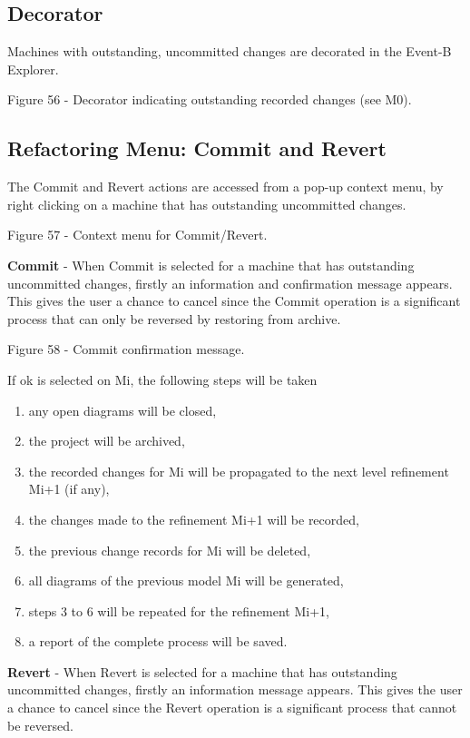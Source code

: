 \subsection{Decorator}

Machines with outstanding, uncommitted changes are decorated in the Event-B Explorer. 

Figure 56 - Decorator indicating outstanding recorded changes (see M0).

\subsection{Refactoring Menu: Commit and Revert}

The Commit and Revert actions are accessed from a pop-up context menu, by right clicking on a machine that has outstanding uncommitted changes.

Figure 57 - Context menu for Commit/Revert.

\textbf{Commit} -
When Commit is selected for a machine that has outstanding uncommitted changes, firstly an information and confirmation message appears. This gives the user a chance to cancel since the Commit operation is a significant process that can only be reversed by restoring from archive.

Figure 58 - Commit confirmation message.

If ok is selected on Mi, the following steps will be taken
\begin{enumerate}
\item any open diagrams will be closed, 
\item the project will be archived,
\item the recorded changes for Mi will be propagated to the next level refinement Mi+1 (if any),
\item the changes made to the refinement Mi+1 will be recorded,
\item the previous change records for Mi will be deleted,
\item all diagrams of the previous model Mi will be generated,
\item steps 3 to 6 will be repeated for the refinement Mi+1,
\item a report of the complete process will be saved.
\end{enumerate}


\textbf{Revert} -
When Revert is selected for a machine that has outstanding uncommitted changes, firstly an information message appears. This gives the user a chance to cancel since the Revert operation is a significant process that cannot be reversed.

